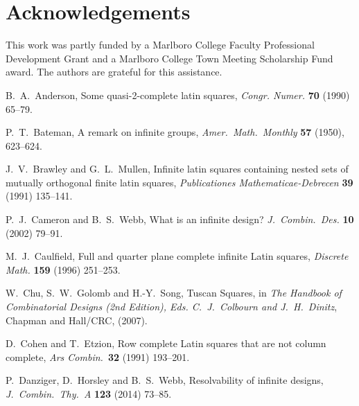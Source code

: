 \documentclass[12pt,a4paper]{article}
\begin{document}
\section*{Acknowledgements}

This work was partly funded by a Marlboro College Faculty Professional Development Grant and a Marlboro College Town Meeting Scholarship Fund award.  The authors are grateful for this assistance.


\begin{thebibliography}{99}


B.~A.~Anderson, Some quasi-2-complete latin squares, {\em Congr. Numer.} {\bf 70} (1990) 65--79.







P.~T.~Bateman, A remark on infinite groups, {\em Amer.~Math.~Monthly} {\bf 57} (1950), 623--624.

J.~V.~Brawley and G.~L.~Mullen, Infinite latin squares containing nested sets of mutually orthogonal finite latin squares, {\em Publicationes Mathematicae-Debrecen} {\bf 39} (1991) 135--141.


P.~J.~Cameron and B.~S.~Webb, What is an infinite design? {\em J.~Combin.~Des.} {\bf 10} (2002) 79--91.

M.~J.~Caulfield, Full and quarter plane complete infinite Latin squares, {\em Discrete Math.} {\bf 159} (1996) 251--253.

W.~Chu, S.~W.~Golomb and H.-Y.~Song, Tuscan Squares, in {\em The Handbook of Combinatorial Designs (2nd Edition), Eds. C.~J.~Colbourn and J.~H.~Dinitz}, Chapman and Hall/CRC, (2007).

D.~Cohen and T.~Etzion, Row complete Latin squares that are not column complete, {\em Ars Combin.}~{\bf 32} (1991) 193--201.

P.~Danziger, D.~Horsley and B.~S.~Webb, Resolvability of infinite designs, {\em J.~Combin.~Thy.~A} {\bf 123} (2014) 73--85.


\end{thebibliography}
\end{document}
